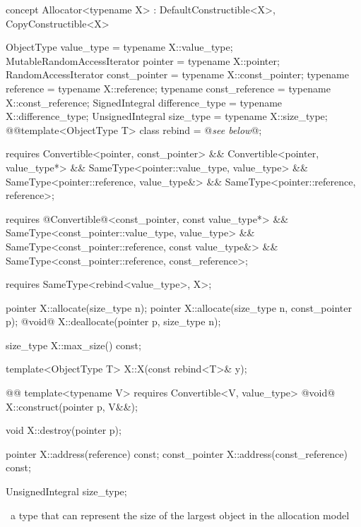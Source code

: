 \documentclass[american,twoside]{book}
\begin{document}
\color{addclr}
\begin{itemdecl}
concept Allocator<typename X> : DefaultConstructible<X>, CopyConstructible<X> {
  ObjectType value_type               = typename X::value_type;
  MutableRandomAccessIterator pointer = typename X::pointer;
  RandomAccessIterator const_pointer  = typename X::const_pointer;
  typename reference                  = typename X::reference;
  typename const_reference            = typename X::const_reference;
  SignedIntegral difference_type      = typename X::difference_type;
  UnsignedIntegral size_type          = typename X::size_type; 
  @\textcolor{addclr}{}@template<ObjectType T> class rebind = @\textit{see below}@;

  requires Convertible<pointer, const_pointer> && 
           Convertible<pointer, value_type*> &&
           SameType<pointer::value_type, value_type> &&
           SameType<pointer::reference, value_type&> &&
           SameType<pointer::reference, reference>;

  requires @\textcolor{addclr}{Convertible}@<const_pointer, const value_type*> && 
           SameType<const_pointer::value_type, value_type> &&
           SameType<const_pointer::reference, const value_type&> &&
           SameType<const_pointer::reference, const_reference>;
 
  requires SameType<rebind<value_type>, X>;

  pointer X::allocate(size_type n);
  pointer X::allocate(size_type n, const_pointer p);
  @\textcolor{addclr}{void}@ X::deallocate(pointer p, size_type n);

  size_type X::max_size() const;

  template<ObjectType T>
    X::X(const rebind<T>& y);

  @@
  template<typename V>
    requires Convertible<V, value_type>
    @\textcolor{addclr}{void}@ X::construct(pointer p, V&&);

  void X::destroy(pointer p);

  pointer X::address(reference) const;
  const_pointer X::address(const_reference) const;
}
\end{itemdecl}
\color{black}

\color{addclr}
\begin{itemdecl}
UnsignedIntegral size_type;
\end{itemdecl}
\color{black}

\begin{itemdescr}
\pnum
\ctype\
a type that can represent the size of the largest object in the allocation model
\end{itemdescr}
\end{document}
